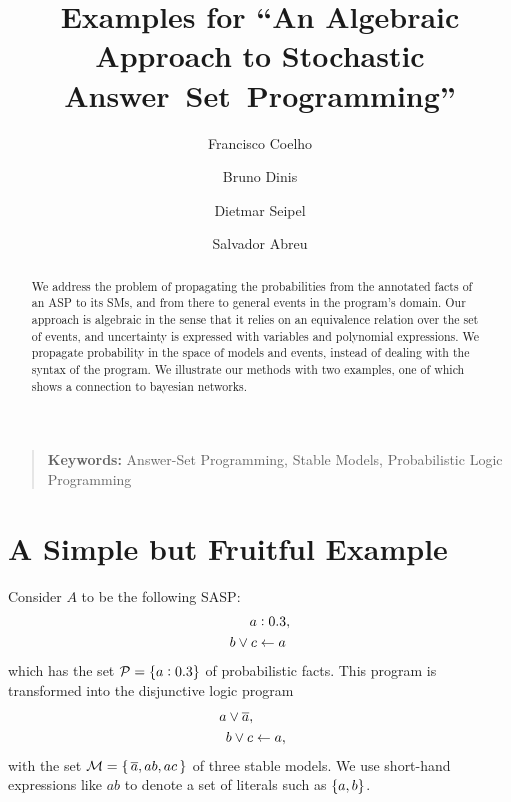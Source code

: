 \documentclass{article}
\begin{document}

\title{%
	Examples for ``An Algebraic Approach to Stochastic
	Answer~Set~Programming''
}
\author{%
	Francisco Coelho
	\and
	Bruno Dinis
	\and %
	Dietmar Seipel
	\and %
	Salvador Abreu   %
}

\maketitle

\begin{abstract}
	We address the problem of propagating the probabilities from the     annotated facts of an \acl{ASP} to its \aclp{SM}, and from there to     general events in the program's domain.
	Our approach is algebraic in the sense that it relies on an
	equivalence relation over the set of events, and uncertainty is
	expressed with variables and polynomial expressions.
	We propagate probability in the space of models and events, instead
	of dealing with the syntax of the program.
	We illustrate our methods with two examples, one of which shows a
	connection to bayesian networks.
\end{abstract}

\begin{quotation}
	\textbf{Keywords:} Answer-Set Programming, Stable Models, Probabilistic Logic Programming
\end{quotation}

\section{A Simple but Fruitful Example}

Consider \(A\) to be the following \ac{SASP}:
\begin{equation}\label{eq:fruitful}
	\begin{split}
		a&:0.3, \\
		b \vee c          & \leftarrow a
	\end{split}
\end{equation}
which has the set \({\cal P} = \{ a:0.3 \}\) of probabilistic
facts.  This program is transformed into the disjunctive logic
program
\begin{equation}\label{eq:derived.fruitful}
	\begin{split}
		a \vee \overline{a},\\
		b \vee c          & \leftarrow a,
	\end{split}
\end{equation}
with the set
\( {\cal M} = \{\, \overline{a}, ab, ac\, \} \)
of three stable models.
We use short-hand expressions like \(ab\) to denote a set
of literals such as \(\set{a, b}\).
\end{document}
